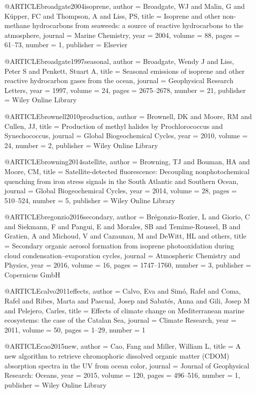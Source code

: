 @ARTICLE{broadgate2004isoprene,
  author = {Broadgate, WJ and Malin, G and K{\"u}pper, FC and Thompson, A and
	Liss, PS},
  title = {Isoprene and other non-methane hydrocarbons from seaweeds: a source
	of reactive hydrocarbons to the atmosphere},
  journal = {Marine Chemistry},
  year = {2004},
  volume = {88},
  pages = {61--73},
  number = {1},
  publisher = {Elsevier}
}

@ARTICLE{broadgate1997seasonal,
  author = {Broadgate, Wendy J and Liss, Peter S and Penkett, Stuart A},
  title = {Seasonal emissions of isoprene and other reactive hydrocarbon gases
	from the ocean},
  journal = {Geophysical Research Letters},
  year = {1997},
  volume = {24},
  pages = {2675--2678},
  number = {21},
  publisher = {Wiley Online Library}
}

@ARTICLE{brownell2010production,
  author = {Brownell, DK and Moore, RM and Cullen, JJ},
  title = {Production of methyl halides by Prochlorococcus and Synechococcus},
  journal = {Global Biogeochemical Cycles},
  year = {2010},
  volume = {24},
  number = {2},
  publisher = {Wiley Online Library}
}

@ARTICLE{browning2014satellite,
  author = {Browning, TJ and Bouman, HA and Moore, CM},
  title = {Satellite-detected fluorescence: Decoupling nonphotochemical quenching
	from iron stress signals in the South Atlantic and Southern Ocean},
  journal = {Global Biogeochemical Cycles},
  year = {2014},
  volume = {28},
  pages = {510--524},
  number = {5},
  publisher = {Wiley Online Library}
}

@ARTICLE{bregonzio2016secondary,
  author = {Br{\'e}gonzio-Rozier, L and Giorio, C and Siekmann, F and Pangui,
	E and Morales, SB and Temime-Roussel, B and Gratien, A and Michoud,
	V and Cazaunau, M and DeWitt, HL and others},
  title = {Secondary organic aerosol formation from isoprene photooxidation
	during cloud condensation--evaporation cycles},
  journal = {Atmospheric Chemistry and Physics},
  year = {2016},
  volume = {16},
  pages = {1747--1760},
  number = {3},
  publisher = {Copernicus GmbH}
}

@ARTICLE{calvo2011effects,
  author = {Calvo, Eva and Sim{\'o}, Rafel and Coma, Rafel and Ribes, Marta and
	Pascual, Josep and Sabat{\'e}s, Anna and Gili, Josep M and Pelejero,
	Carles},
  title = {Effects of climate change on Mediterranean marine ecosystems: the
	case of the Catalan Sea},
  journal = {Climate Research},
  year = {2011},
  volume = {50},
  pages = {1--29},
  number = {1}
}

@ARTICLE{cao2015new,
  author = {Cao, Fang and Miller, William L},
  title = {A new algorithm to retrieve chromophoric dissolved organic matter
	(CDOM) absorption spectra in the UV from ocean color},
  journal = {Journal of Geophysical Research: Oceans},
  year = {2015},
  volume = {120},
  pages = {496--516},
  number = {1},
  publisher = {Wiley Online Library}
}

